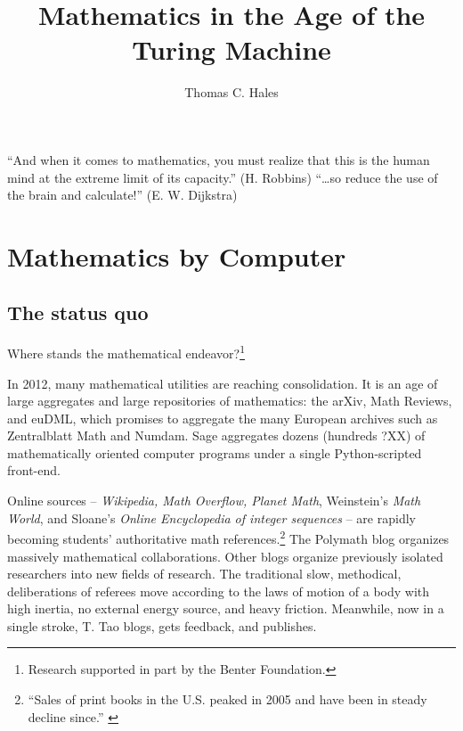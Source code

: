 \documentclass{llncs}
\begin{document}
\title{Mathematics in the Age of the Turing Machine}
\author{Thomas C. Hales}
\maketitle


\section*{}

{

\narrower

\it

``And when it comes to mathematics, you must realize that this is the human mind
at the extreme limit of its capacity.'' (H. Robbins) ``\ldots so reduce the use of
the brain and calculate!'' (E. W. Dijkstra)  

}


\section{Mathematics by Computer}

\subsection{The status quo}

Where stands the mathematical endeavor?\footnote{Research supported in part by the Benter Foundation.}

In 2012, many mathematical utilities are reaching consolidation.  It
is an age of large aggregates and large repositories of mathematics:
the arXiv, Math Reviews, and euDML, which promises to aggregate the
many European archives such as Zentralblatt Math and Numdam.  Sage
aggregates dozens (hundreds ?XX) of mathematically oriented computer
programs under a single Python-scripted front-end.


Online sources -- {\it Wikipedia, Math Overflow, Planet Math},
Weinstein's {\it Math World}, and Sloane's {\it Online Encyclopedia of
  integer sequences} -- are rapidly becoming students' authoritative
math references.\footnote{``Sales of print books in the U.S. peaked in
  2005 and have been in steady decline since.'' \cite{XX Bill Keller,
    New York Times Magazine, p9.July 17, 2011}} The Polymath blog
organizes massively mathematical collaborations.  Other blogs organize
previously isolated researchers into new fields of research.  The
traditional slow, methodical, deliberations of referees move according
to the laws of motion of a body with high inertia, no external energy
source, and heavy friction.  Meanwhile, now in a single stroke, T. Tao
blogs, gets feedback, and publishes.
\end{document}
